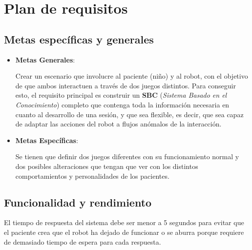 \documentclass{uc3mpracticas}
\begin{document}
  \frontmatter



  \vspace{60mm}


  \newpage


  \mainmatter

  \section{Plan de requisitos}
  \subsection{Metas específicas y generales}

  \begin{itemize}
    \item \textbf{Metas Generales}:

    Crear un escenario que involucre al paciente (niño) y al robot, con el objetivo de que ambos interactuen a través de dos juegos distintos. Para conseguir esto, el requisito principal es construir un \textbf{SBC} (\textit{Sistema Basado en el Conocimiento}) completo que contenga toda la información necesaria en cuanto al desarrollo de una sesión, y que sea flexible, es decir, que sea capaz de adaptar las acciones del robot a flujos anómalos de la interacción.

    \item \textbf{Metas Específicas}:

    Se tienen que definir dos juegos diferentes con su funcionamiento normal y dos posibles alteraciones que tengan que ver con los distintos comportamientos y personalidades de los pacientes.
  \end{itemize}

  \subsection{Funcionalidad y rendimiento}

  El tiempo de respuesta del sistema debe ser menor a 5 segundos para evitar que el paciente crea que el robot ha dejado de funcionar o se aburra porque requiere de demasiado tiempo de espera para cada respuesta.
\end{document}
